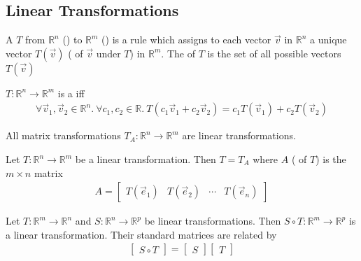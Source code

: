 \documentclass{article}
\begin{document}
\subsection{Linear Transformations}
\begin{definition}
    A  $T$ from $\mathbb{R}^n$ () to $\mathbb{R}^m$ () is a rule which assigns to each vector $\vec v$ in $\mathbb{R}^n$ a unique vector $T(\vec v)$ ( of $\vec v$ under $T$) in $\mathbb{R}^m$. 
    The  of $T$ is the set of all possible vectors $T(\vec v)$
\end{definition}
\begin{definition}
   $T:\mathbb{R}^n \to \mathbb{R}^m$ is a  iff
    \begin{align*}        
        \forall \vec v_1, \vec v_2 \in \mathbb{R}^n.\:\forall c_1, c_2 \in \mathbb{R}.\: T(c_1\vec v_1 + c_2\vec v_2) = c_1T(\vec v_1) + c_2T(\vec v_2)
    \end{align*}
\end{definition}
\begin{theorem}
    All matrix transformations $T_A:\mathbb{R}^n\to\mathbb{R}^m$ are linear transformations.
\end{theorem}
\begin{theorem}
    Let $T:\mathbb{R}^n\to\mathbb{R}^m$ be a linear transformation. Then $T=T_A$ where $A$ ( of $T$) is the $m\times n$ matrix 
    \begin{align*}
        A = \begin{bmatrix}
            T(\vec e_1) & T(\vec e_2) & \cdots & T(\vec e_n)
        \end{bmatrix}
    \end{align*}
\end{theorem}
\begin{theorem}
    Let $T:\mathbb{R}^m\to\mathbb{R}^n$ and $S:\mathbb{R}^n\to\mathbb{R}^p$ be linear transformations. Then $S\circ T:\mathbb{R}^m\to\mathbb{R}^p$ is a linear transformation. Their standard matrices are related by
    \begin{align*}
        \begin{bmatrix}
            S\circ T
        \end{bmatrix}
        = \begin{bmatrix}
            S
        \end{bmatrix}
        \begin{bmatrix}
            T
        \end{bmatrix}
    \end{align*}
\end{theorem}
\end{document}
